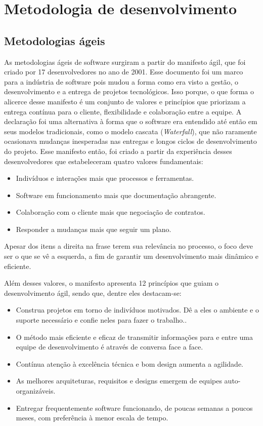 \section{Metodologia de desenvolvimento}
\subsection{Metodologias ágeis}
As metodologias ágeis de software surgiram a partir do manifesto ágil, que foi criado por 17 desenvolvedores no ano de 2001. Esse documento foi um marco para a indústria de software pois mudou a forma como era visto a gestão, o desenvolvimento e a entrega de projetos tecnológicos. Isso porque, o que forma o alicerce desse manifesto é
um conjunto de valores e princípios que priorizam a entrega contínua para o cliente, flexibilidade e colaboração entre a equipe. A declaração foi uma alternativa à forma que o software era entendido até então em seus modelos tradicionais, como o modelo cascata (\textit{Waterfall}), que não raramente ocasionava mudanças inesperadas nas entregas e longos ciclos de desenvolvimento do projeto. Esse manifesto então, foi criado a partir da experiência desses desenvolvedores que estabeleceram quatro valores fundamentais: 

\begin{itemize}
    \item Indivíduos e interações mais que processos e ferramentas.
    \item Software em funcionamento mais que documentação abrangente.
    \item Colaboração com o cliente mais que negociação de contratos.
    \item Responder a mudanças mais que seguir um plano.
\end{itemize}

Apesar dos itens a direita na frase terem sua relevância no processo, o foco deve ser o que se vê a esquerda, a fim de garantir um desenvolvimento mais dinâmico e eficiente.

Além desses valores, o manifesto apresenta 12 princípios que guiam o desenvolvimento ágil, sendo que, dentre eles destacam-se:

\begin{itemize}
    \item Construa projetos em torno de indivíduos motivados. Dê a eles o ambiente e o suporte necessário e confie neles para fazer o trabalho..
    \item O método mais eficiente e eficaz de transmitir informações para e entre uma equipe de desenvolvimento é através de conversa face a face.
    \item Contínua atenção à excelência técnica e bom design aumenta a agilidade.
    \item As melhores arquiteturas, requisitos e designs emergem de equipes auto-organizáveis.
    \item Entregar frequentemente software funcionando, de poucas semanas a poucos meses, com preferência à menor escala de tempo.
\end{itemize}

